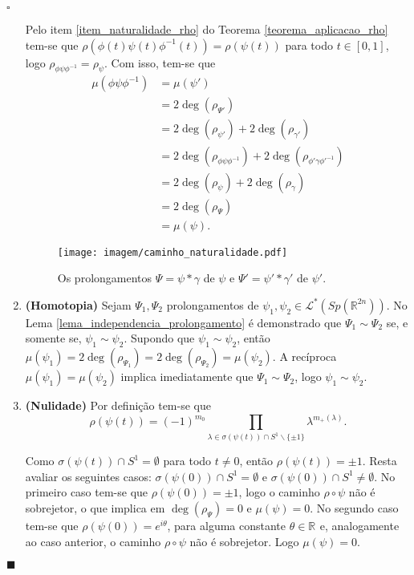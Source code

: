 \documentclass[12pt]{book}
\newenvironment{prova}[1]{$\square$ #1}{\hfill$\blacksquare$}
\newcommand{\caminhosespeciais}[1]{\mathcal{L}^{*}(#1)}
\newcommand{\circulo}{S^{1}}
\newcommand{\complementar}[2]{#1 \backslash #2}
\newcommand{\espectrooperador}[1]{\sigma(#1)}
\newcommand{\gruposimpletico}[1]{Sp(#1)}
\newcommand{\intervalo}{[0,1]}
\newcommand{\real}[1]{\mathbb{R}^{#1}}
\newcommand{\reta}{\real{}}
\begin{document}
\begin{prova}
\begin{enumerate}
			Pelo item \ref{item_naturalidade_rho} do Teorema \ref{teorema_aplicacao_rho} tem-se que  $\rho(\phi(t)\psi(t)\phi^{-1}(t)) = \rho(\psi(t))$ para todo $t\in \intervalo$, logo $\rho_{\phi\psi\phi^{-1}} = \rho_{\psi}$. Com isso, tem-se que 
			$$
			\begin{aligned}
			\mu(\phi\psi\phi^{-1})
			&=\mu(\psi')
			\\
			&= 2\deg(\rho_{\Psi'})
			\\
			&= 2\deg(\rho_{\psi'}) + 2\deg(\rho_{\gamma'})
			\\
			&=2\deg(\rho_{\phi\psi\phi^{-1}}) + 2\deg(\rho_{\phi'\gamma\phi'^{-1}})
			\\
			&=2\deg(\rho_{\psi}) + 2\deg(\rho_{\gamma})
			\\
			&=2\deg(\rho_{\Psi})
			\\
			&= \mu(\psi).			
			\end{aligned}
			$$
			
			\begin{figure}[!h]
				\centering
				\texttt{[image: imagem/caminho\_naturalidade.pdf]}
				\caption{Os prolongamentos $\Psi=\psi*\gamma$ de $\psi$ e $\Psi'  = \psi'*\gamma'$ de $\psi'$.}
			\end{figure}
			
			\item \textbf{(Homotopia)} Sejam $\Psi_{1}, \Psi_{2}$ prolongamentos de $\psi_{1}, \psi_{2} \in \caminhosespeciais{\gruposimpletico{\real{2n}}}$. No Lema \ref{lema_independencia_prolongamento} é demonstrado que $\Psi_{1}\sim \Psi_{2}$ se, e somente se, $\psi_{1}\sim \psi_{2}$. Supondo que $\psi_{1}\sim \psi_{2}$, então $\mu(\psi_{1}) = 2\deg(\rho_{\Psi_{1}}) = 2\deg(\rho_{\Psi_{2}}) = \mu(\psi_{2})$. A recíproca $\mu(\psi_{1}) = \mu(\psi_{2})$ implica imediatamente que $\Psi_{1}\sim \Psi_{2}$, logo $\psi_{1}\sim \psi_{2}$.
			
			\item \textbf{(Nulidade)} Por definição tem-se que 
			$$
			\rho(\psi(t)) = (-1)^{m_{0}} \prod_{\lambda \in \sigma(\psi(t))\cap \complementar{\circulo}{\{\pm 1 \}  }}\lambda^{m_{+}(\lambda)}.
			$$
			
			Como  $\espectrooperador{\psi(t)}\cap \circulo = \emptyset$ para todo $t\neq 0$, então $	\rho(\psi(t))=\pm 1$. Resta avaliar os seguintes casos: $\espectrooperador{\psi(0)}\cap \circulo = \emptyset$ e $\espectrooperador{\psi(0)}\cap \circulo \neq \emptyset$. No primeiro caso tem-se que $	\rho(\psi(0))=\pm 1$, logo o caminho  $\rho\circ\psi$ não é sobrejetor, o que implica em $\deg(\rho_{\Psi}) = 0$ e $\mu(\psi) = 0$. No segundo caso tem-se que $	\rho(\psi(0))=e^{i\theta}$, para alguma constante $\theta \in \reta$ e, analogamente ao caso anterior, o caminho $\rho\circ\psi$ não é sobrejetor. Logo $\mu(\psi)=0$. 
			

\end{enumerate}
\end{prova}
\end{document}
